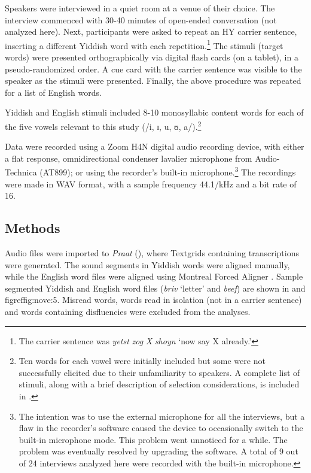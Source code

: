 \documentclass[output=paper]{langsci/langscibook}
\begin{document}
Speakers were interviewed in a quiet room at a venue of their choice. The interview commenced with 30-40 minutes of open-ended conversation (not analyzed here). Next, participants were asked to repeat an HY carrier sentence, inserting a different Yiddish word with each repetition.\footnote{The carrier sentence was \textit{yetst} \textit{zog} \textit{X} \textit{shoyn} ‘now say X already.’} The stimuli (target words) were presented orthographically via digital flash cards (on a tablet), in a pseudo-randomized order. A cue card with the carrier sentence was visible to the speaker as the stimuli were presented. Finally, the above procedure was repeated for a list of English words. 

Yiddish and English stimuli included 8-10 monosyllabic content words for each of the five vowels relevant to this study (/i, ɪ, u, ʊ, a/).\footnote{Ten words for each vowel were initially included but some were not successfully elicited due to their unfamiliarity to speakers. A complete list of stimuli, along with a brief description of selection considerations, is included in .}  

Data were recorded using a Zoom H4N digital audio recording device, with either a flat response, omnidirectional condenser lavalier microphone from Audio-Technica (AT899); or using the recorder’s built-in microphone.\footnote{The intention was to use the external microphone for all the interviews, but a flaw in the recorder’s software caused the device to occasionally switch to the built-in microphone mode. This problem went unnoticed for a while. The problem was eventually resolved by upgrading the software. A total of 9 out of 24 interviews analyzed here were recorded with the built-in microphone.}  The recordings were made in WAV format, with a sample frequency 44.1/kHz and a bit rate of 16.


 
 \subsection{Methods}
\label{sec:nove:4.2}


Audio files were imported to \textit{Praat} (\citealt{BoersmaWeenink2018}), where Textgrids containing transcriptions were generated. The sound segments in Yiddish words were aligned manually, while the English word files were aligned using Montreal Forced Aligner \citep{McAuliffeEtAl2017}. Sample segmented Yiddish and English word files (\textit{briv} ‘letter’ and \textit{beef}) are shown in  and figref{fig:nove:5}. Misread words, words read in isolation (not in a carrier sentence) and words containing disfluencies were excluded from the analyses.
\end{document}
